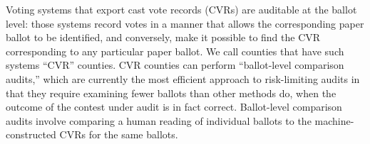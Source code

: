 \documentclass[runningheads]{llncs}
\begin{document}
%

Voting systems that export cast vote records (CVRs) are auditable at the ballot level: 
those systems record votes in a manner that allows the corresponding paper ballot to be identified,
and conversely, make it possible to find the CVR corresponding to any
particular paper ballot.
We call counties that have such systems ``CVR'' counties.
CVR counties can perform ``ballot-level comparison audits,'' \cite{lindemanStark12} 
which are currently the most efficient approach to risk-limiting audits in that they require examining fewer
ballots than other methods do, when the outcome of the contest under audit 
is in fact correct.
Ballot-level comparison audits involve comparing a human reading of individual ballots to the machine-constructed CVRs for the same ballots.
\end{document}
